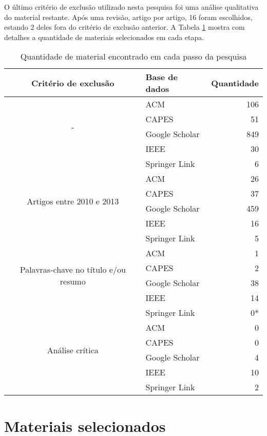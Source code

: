 			O último critério de exclusão utilizado nesta pesquisa foi uma análise qualitativa do material restante. Após uma revisão, artigo por artigo, 16 foram escolhidos, estando 2 deles fora do critério de exclusão anterior. A Tabela  \ref{tab:quantidadeDeMateriais} mostra com detalhes a quantidade de materiais selecionados em cada etapa.
			\begin{table}[H]
				\centering
				\begin{tabular}{| c | l | r |} \hline \textbf{Critério de exclusão} & \textbf{Base de dados}  & \textbf{Quantidade} \\ \hline
					\multirow{4}{*}{-}
						& ACM & 106 \\ \cline{2-3}
						& CAPES & 51 \\ \cline{2-3}
						& Google Scholar & 849 \\ \cline{2-3}
						& IEEE & 30 \\ \cline{2-3}
						& Springer Link & 6 \\ \cline{2-3}
					\hline \hline
					\multirow{4}{*}{Artigos entre 2010 e 2013} 
						& ACM & 26 \\ \cline{2-3}
						& CAPES & 37 \\ \cline{2-3}
						& Google Scholar & 459 \\ \cline{2-3}
						& IEEE & 16 \\ \cline{2-3}
						& Springer Link & 5 \\ \cline{2-3}
					\hline \hline
					\multirow{4}{*}{Palavras-chave no título e/ou resumo} 
						& ACM & 1 \\ \cline{2-3}
						& CAPES & 2 \\ \cline{2-3}
						& Google Scholar & 38 \\ \cline{2-3}
						& IEEE & 14 \\ \cline{2-3}
						& Springer Link & 0* \\ \cline{2-3}
					\hline \hline
					\multirow{4}{*}{Análise crítica}
						& ACM & 0 \\ \cline{2-3}
						& CAPES & 0 \\ \cline{2-3}
						& Google Scholar & 4 \\ \cline{2-3}
						& IEEE & 10 \\ \cline{2-3}
						& Springer Link & 2 \\ \cline{2-3}
					\hline
				\end{tabular}
				\caption{Quantidade de material encontrado em cada passo da pesquisa}
				\label{tab:quantidadeDeMateriais}
			\end{table}

	\section{Materiais selecionados}